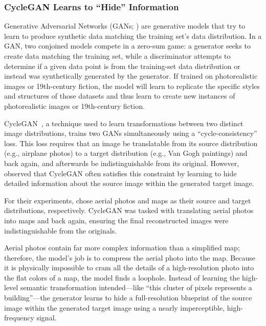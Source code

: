 \subsubsection{CycleGAN Learns to ``Hide'' Information~\citep{chu2017cycleganmastersteganography}}
\label{sec:cyclegan}

Generative Adversarial Networks (GANs; \citealp{goodfellow2014generative}) are generative models that try to learn to produce synthetic data matching the training set's data distribution.
In a GAN, two conjoined models compete in a zero-sum game: a generator seeks to create data matching the training set, while a discriminator attempts to determine if a given data point is from the training-set data distribution or instead was synthetically generated by the generator.
If trained on photorealistic images or 19th-century fiction, the model will learn to replicate the specific styles and structures of those datasets and thus learn to create new instances of photorealistic images or 19th-century fiction.

CycleGAN~\citep{zhu2020unpairedimagetoimagetranslationusing}, a technique used to learn transformations between two distinct image distributions, trains two GANs simultaneously using a ``cycle-consistency'' loss. This loss requires that an image be translatable from its source distribution (e.g., airplane photos) to a target distribution (e.g., Van Gogh paintings) and back again, and afterwards be indistinguishable from its original. However, \citet{chu2017cycleganmastersteganography} observed that CycleGAN often satisfies this constraint by learning to hide detailed information about the source image within the generated target image. %

For their experiments, \citet{chu2017cycleganmastersteganography} chose aerial photos and maps as their source and target distributions, respectively. CycleGAN was tasked with translating aerial photos into maps and back again, ensuring the final reconstructed images were indistinguishable from the originals.

Aerial photos contain far more complex information than a simplified map; therefore, the model's job is to compress the aerial photo into the map. Because it is physically impossible to cram all the details of a high-resolution photo into the flat colors of a map, the model finds a loophole. Instead of learning the high-level semantic transformation intended---like ``this cluster of pixels represents a building''---the generator learns to hide a full-resolution blueprint of the source image within the generated target image using a nearly imperceptible, high-frequency signal.

